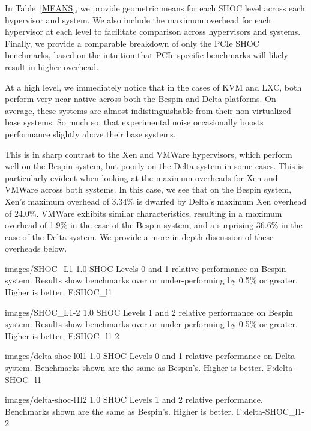

In Table~\ref{MEANS}, we provide geometric means for each SHOC level across each
hypervisor and system.  We also include the maximum
overhead for each hypervisor at each level to facilitate comparison across
hypervisors and systems.  Finally, we provide a comparable breakdown of only the
PCIe SHOC benchmarks, based on the intuition that PCIe-specific benchmarks will
likely result in higher overhead.  

At a high level, we immediately notice that in the cases of KVM and LXC, both
perform very near native across both the Bespin and Delta platforms.  On
average, these systems are almost indistinguishable from their non-virtualized
base systems.  So much so, that experimental noise occasionally boosts
performance slightly above their base systems.  

This is in sharp contrast to the Xen and VMWare hypervisors, which perform well
on the Bespin system, but poorly on the Delta system in some cases.  This is
particularly evident when looking at the maximum overheads for Xen and VMWare
across both systems.  In this case, we see that on the Bespin system, Xen's
maximum overhead of 3.34\% is dwarfed by Delta's maximum Xen overhead of 24.0\%.
VMWare exhibits similar characteristics, resulting in a maximum overhead of
1.9\% in the case of the Bespin system, and a surprising 36.6\% in the case of
the Delta system.  We provide a more in-depth discussion of these overheads
below.


  {images/SHOC_L1}
  {1.0}
  {SHOC Levels 0 and 1 relative performance on Bespin system.  Results show benchmarks over or
under-performing by 0.5\% or greater.  Higher is better.}
  {F:SHOC_l1} 

  {images/SHOC_L1-2}
  {1.0}
  {SHOC Levels 1 and 2 relative performance on Bespin system.  Results show benchmarks over or
under-performing by 0.5\% or greater.  Higher is better.}
  {F:SHOC_l1-2} 

  {images/delta-shoc-l0l1}
  {1.0}
  {SHOC Levels 0 and 1 relative performance on Delta system.  Benchmarks
shown are the same as Bespin's.  Higher is better.}
  {F:delta-SHOC_l1} 

  {images/delta-shoc-l1l2}
  {1.0}
  {SHOC Levels 1 and 2 relative performance. Benchmarks shown are the same as
Bespin's.   Higher is better.}
  {F:delta-SHOC_l1-2} 



